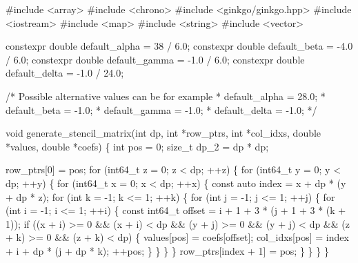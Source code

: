 \begin{DoxyCodeInclude}
\textcolor{preprocessor}{#include <array>}
\textcolor{preprocessor}{#include <chrono>}
\textcolor{preprocessor}{#include <ginkgo/ginkgo.hpp>}
\textcolor{preprocessor}{#include <iostream>}
\textcolor{preprocessor}{#include <map>}
\textcolor{preprocessor}{#include <string>}
\textcolor{preprocessor}{#include <vector>}

constexpr \textcolor{keywordtype}{double} default\_alpha = 38 / 6.0;
constexpr \textcolor{keywordtype}{double} default\_beta = -4.0 / 6.0;
constexpr \textcolor{keywordtype}{double} default\_gamma = -1.0 / 6.0;
constexpr \textcolor{keywordtype}{double} default\_delta = -1.0 / 24.0;

\textcolor{comment}{/* Possible alternative values can be for example}
\textcolor{comment}{ * default\_alpha = 28.0;}
\textcolor{comment}{ * default\_beta = -1.0;}
\textcolor{comment}{ * default\_gamma = -1.0;}
\textcolor{comment}{ * default\_delta = -1.0;}
\textcolor{comment}{ */}

\textcolor{keywordtype}{void} generate\_stencil\_matrix(\textcolor{keywordtype}{int} dp, \textcolor{keywordtype}{int} *row\_ptrs, \textcolor{keywordtype}{int} *col\_idxs,
                             \textcolor{keywordtype}{double} *values, \textcolor{keywordtype}{double} *coefs)
\{
    \textcolor{keywordtype}{int} pos = 0;
    \textcolor{keywordtype}{size\_t} dp\_2 = dp * dp;


    row\_ptrs[0] = pos;
    \textcolor{keywordflow}{for} (int64\_t z = 0; z < dp; ++z) \{
        \textcolor{keywordflow}{for} (int64\_t y = 0; y < dp; ++y) \{
            \textcolor{keywordflow}{for} (int64\_t x = 0; x < dp; ++x) \{
                \textcolor{keyword}{const} \textcolor{keyword}{auto} index = x + dp * (y + dp * z);
                \textcolor{keywordflow}{for} (\textcolor{keywordtype}{int} k = -1; k <= 1; ++k) \{
                    \textcolor{keywordflow}{for} (\textcolor{keywordtype}{int} j = -1; j <= 1; ++j) \{
                        \textcolor{keywordflow}{for} (\textcolor{keywordtype}{int} i = -1; i <= 1; ++i) \{
                            \textcolor{keyword}{const} int64\_t offset =
                                i + 1 + 3 * (j + 1 + 3 * (k + 1));
                            \textcolor{keywordflow}{if} ((x + i) >= 0 && (x + i) < dp && (y + j) >= 0 &&
                                (y + j) < dp && (z + k) >= 0 && (z + k) < dp) \{
                                values[pos] = coefs[offset];
                                col\_idxs[pos] = index + i + dp * (j + dp * k);
                                ++pos;
                            \}
                        \}
                    \}
                \}
                row\_ptrs[index + 1] = pos;
            \}
        \}
    \}
\}



\end{DoxyCodeInclude}
